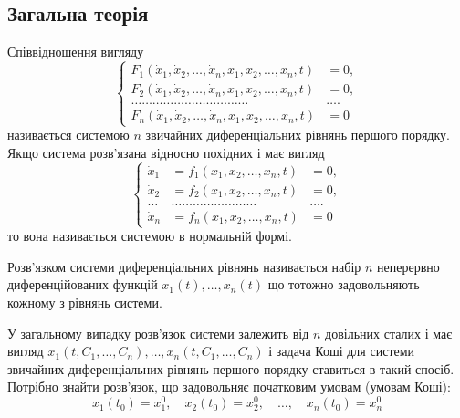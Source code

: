 \subsection{Загальна теорія}

Співвідношення вигляду
\begin{equation*}
	\left\{
		\begin{aligned}
			F_1(\dot x_1, \dot x_2, \ldots, \dot x_n, x_1, x_2, \ldots, x_n, t) &= 0, \\
			F_2(\dot x_1, \dot x_2, \ldots, \dot x_n, x_1, x_2, \ldots, x_n, t) &= 0, \\
			\ldots \ldots \ldots \ldots \ldots \ldots \ldots \ldots \ldots \ldots \ldots & \ldots . \\
			F_n(\dot x_1, \dot x_2, \ldots, \dot x_n, x_1, x_2, \ldots, x_n, t) &= 0
		\end{aligned}
	\right.
\end{equation*}
називається системою $n$ звичайних диференціальних рівнянь першого порядку. \\

Якщо система розв'язана відносно похідних і має вигляд
\begin{equation*}
	\left\{
		\begin{aligned}
			\dot x_1 &= f_1(x_1, x_2, \ldots, x_n, t) &= 0, \\
			\dot x_2 &= f_2(x_1, x_2, \ldots, x_n, t) &= 0, \\
			\ldots & \ldots \ldots \ldots \ldots \ldots \ldots \ldots \ldots &\ldots . \\
			\dot x_n &= f_n(x_1, x_2, \ldots, x_n, t) &= 0
		\end{aligned}
	\right.
\end{equation*}
то вона називається системою в нормальній формі.

\begin{definition}
	Розв'язком системи диференціальних рівнянь на\-зи\-ва\-є\-ть\-ся набір $n$ неперервно диференційованих функцій $x_1(t), \ldots, x_n(t)$ що тотожно задовольняють кожному з рівнянь системи.
\end{definition}

У загальному випадку розв'язок системи залежить від $n$ довільних сталих і має вигляд  $x_1(t, C_1, \ldots, C_n), \ldots, x_n(t, C_1, \ldots, C_n)$ і задача Коші для системи звичайних диференціальних рівнянь першого порядку ставиться в такий спосіб. Потрібно знайти розв'язок, що задовольняє початковим умовам (умовам Коші):
\begin{equation*}
	x_1(t_0) = x_1^0, \quad x_2(t_0) = x_2^0, \quad \ldots, \quad x_n(t_0) = x_n^0
\end{equation*}

